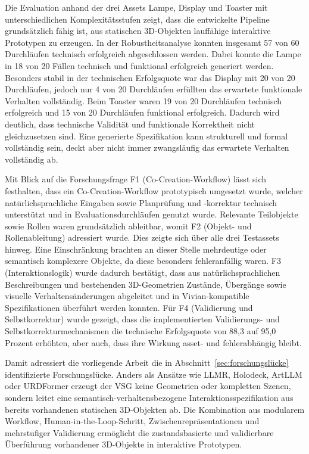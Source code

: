 Die Evaluation anhand der drei Assets Lampe, Display und Toaster mit unterschiedlichen Komplexitätsstufen zeigt, dass die entwickelte Pipeline grundsätzlich fähig ist, aus statischen 3D-Objekten lauffähige interaktive Prototypen zu erzeugen. In der Robustheitsanalyse konnten insgesamt 57 von 60 Durchläufen technisch erfolgreich abgeschlossen werden. Dabei konnte die Lampe in 18 von 20 Fällen technisch und funktional erfolgreich generiert werden. Besonders stabil in der technischen Erfolgsquote war das Display mit 20 von 20 Durchläufen, jedoch nur 4 von 20 Durchläufen erfüllten das erwartete funktionale Verhalten vollständig. Beim Toaster waren 19 von 20 Durchläufen technisch erfolgreich und 15 von 20 Durchläufen funktional erfolgreich. Dadurch wird deutlich, dass technische Validität und funktionale Korrektheit nicht gleichzusetzen sind. Eine generierte Spezifikation kann strukturell und formal vollständig sein, deckt aber nicht immer zwangsläufig das erwartete Verhalten vollständig ab.

Mit Blick auf die Forschungsfrage F1 (Co-Creation-Workflow) lässt sich festhalten, dass ein Co-Creation-Workflow prototypisch umgesetzt wurde, welcher natürlichsprachliche Eingaben sowie Planprüfung und -korrektur technisch unterstützt und in Evaluationsdurchläufen genutzt wurde. Relevante Teilobjekte sowie Rollen waren grundsätzlich ableitbar, womit F2 (Objekt- und Rollenableitung) adressiert wurde. Dies zeigte sich über alle drei Testassets hinweg. Eine Einschränkung brachten an dieser Stelle mehrdeutige oder semantisch komplexere Objekte, da diese besonders fehleranfällig waren. F3 (Interaktionslogik) wurde dadurch bestätigt, dass aus natürlichsprachlichen Beschreibungen und bestehenden 3D-Geometrien Zustände, Übergänge sowie visuelle Verhaltensänderungen abgeleitet und in Vivian-kompatible Spezifikationen überführt werden konnten. Für F4 (Validierung und Selbstkorrektur) wurde gezeigt, dass die implementierten Validierungs- und Selbstkorrekturmechanismen die technische Erfolgsquote von 88,3 auf 95,0 Prozent erhöhten, aber auch, dass ihre Wirkung asset- und fehlerabhängig bleibt.

Damit adressiert die vorliegende Arbeit die in Abschnitt~\ref{sec:forschungslücke} identifizierte Forschungslücke. Anders als Ansätze wie LLMR, Holodeck, ArtLLM oder URDFormer erzeugt der VSG keine Geometrien oder kompletten Szenen, sondern leitet eine semantisch-verhaltensbezogene Interaktionsspezifikation aus bereits vorhandenen statischen 3D-Objekten ab. Die Kombination aus modularem Workflow, Human-in-the-Loop-Schritt, Zwischenrepräsentationen und mehrstufiger Validierung ermöglicht die zustandsbasierte und validierbare Überführung vorhandener 3D-Objekte in interaktive Prototypen.

